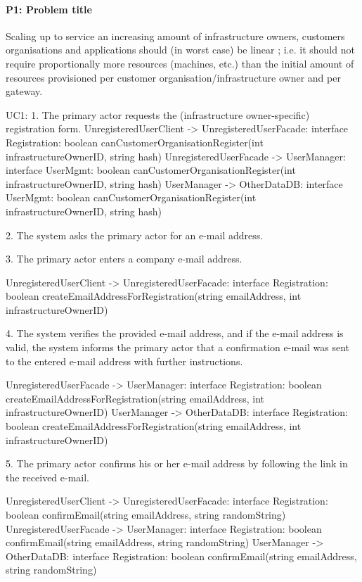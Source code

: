     \paragraph{P1: Problem title}
        Scaling up to service an increasing amount of infrastructure owners,
        customers organisations and applications should (in worst case) be linear ;
        i.e. it should not require proportionally more resources (machines, etc.)
        than the initial amount of resources provisioned per customer
        organisation/infrastructure owner and per gateway.


    UC1:
        1. The primary actor requests the (infrastructure owner-specific) registration form.
            UnregisteredUserClient -> UnregisteredUserFacade: interface Registration: boolean canCustomerOrganisationRegister(int infrastructureOwnerID, string hash)
            UnregisteredUserFacade -> UserManager: interface UserMgmt: boolean canCustomerOrganisationRegister(int infrastructureOwnerID, string hash)
            UserManager -> OtherDataDB: interface UserMgmt: boolean canCustomerOrganisationRegister(int infrastructureOwnerID, string hash)

        2. The system asks the primary actor for an e-mail address.

        3. The primary actor enters a company e-mail address.

            UnregisteredUserClient -> UnregisteredUserFacade: interface Registration: boolean createEmailAddressForRegistration(string emailAddress, int infrastructureOwnerID)

        4. The system verifies the provided e-mail address, and if the e-mail address is valid, the system
           informs the primary actor that a confirmation e-mail was sent to the entered e-mail address
           with further instructions.

            UnregisteredUserFacade -> UserManager: interface Registration: boolean createEmailAddressForRegistration(string emailAddress, int infrastructureOwnerID)
            UserManager -> OtherDataDB: interface Registration: boolean createEmailAddressForRegistration(string emailAddress, int infrastructureOwnerID)

        5. The primary actor confirms his or her e-mail address by following the link in the received e-mail.

            UnregisteredUserClient -> UnregisteredUserFacade: interface Registration: boolean confirmEmail(string emailAddress, string randomString)
            UnregisteredUserFacade -> UserManager: interface Registration: boolean confirmEmail(string emailAddress, string randomString)
            UserManager -> OtherDataDB: interface Registration: boolean confirmEmail(string emailAddress, string randomString)

